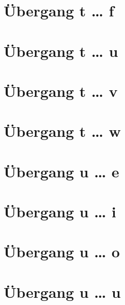 \documentclass[a4paper,landscape]{article}
\begin{document}
\hspace*{-1ex}
\newpage

\section{Übergang t … f }

\hspace*{-1ex}
\newpage

\section{Übergang t … u }

\hspace*{-1ex}
\newpage

\section{Übergang t … v }

\hspace*{-1ex}
\newpage

\section{Übergang t … w }

\hspace*{-1ex}
\newpage

\section{Übergang u … e }

\hspace*{-1ex}
\newpage

\section{Übergang u … i }

\hspace*{-1ex}
\newpage

\section{Übergang u … o }

\hspace*{-1ex}
\newpage


\section{Übergang u … u }
\end{document}

